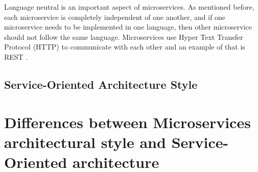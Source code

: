 \documentclass{IEEEtran}
\begin{document}
			Language neutral is an important aspect of microservices. As mentioned before, each microservice is completely independent of one another, and if one microservice needs to be implemented in one language, then other microservice should not follow the same language. Microservices use Hyper Text Transfer Protocol (HTTP) to communicate with each other and an example of that is REST \cite{ibmred}.

		\subsection{Service-Oriented Architecture Style}
			
	\section{Differences between Microservices architectural style and Service-Oriented architecture}




	\newpage
	
	
\end{document}
